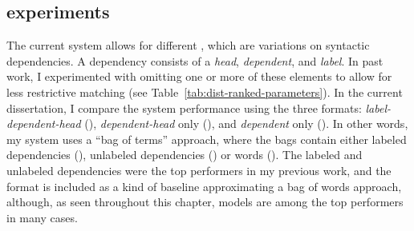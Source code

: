 \subsection{ experiments}
\label{sec:exp-term-reps}
The current system allows for different , which are variations on syntactic dependencies. A dependency consists of a \textit{head}, \textit{dependent}, and \textit{label}. In past work, I experimented with omitting one or more of these elements to allow for less restrictive matching (see Table~\ref{tab:dist-ranked-parameters}). In the current dissertation, I compare the system performance using the three formats: \textit{label-dependent-head} (), \textit{dependent-head} only (), and \textit{dependent} only (). In other words, my system uses a ``bag of terms'' approach, where the bags contain either labeled dependencies (), unlabeled dependencies () or words (). The labeled and unlabeled dependencies were the top performers in my previous work, and the  format is included as a kind of baseline approximating a bag of words approach, although, as seen throughout this chapter,  models are among the top performers in many cases.

